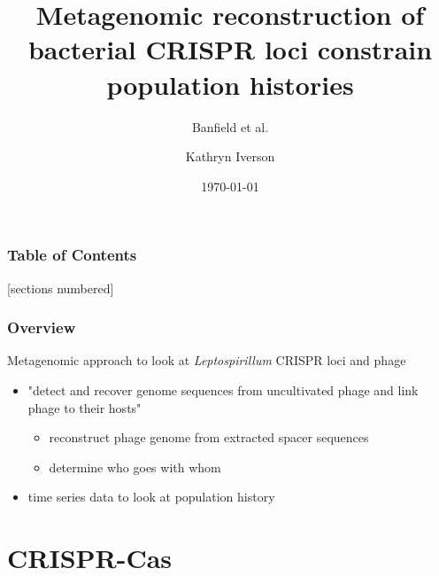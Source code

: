 \documentclass[10pt]{beamer}
\title{Metagenomic reconstruction of bacterial CRISPR loci constrain population histories}
\subtitle{Banfield et al.}
\date{\today}
\author{Kathryn Iverson}
\institute{Schloss Lab \\ \LaTeX}
\begin{document}
\maketitle

\begin{frame}
  \frametitle{Table of Contents}
  [sections numbered]
  \tableofcontents[hideallsubsections]
\end{frame}

\begin{frame}[fragile]
	\frametitle{Overview}

Metagenomic approach to look at \emph{Leptospirillum} CRISPR loci and phage
	\begin{itemize}
        \item "detect and recover genome sequences from uncultivated phage and link phage to their hosts"
        \begin{itemize}
        	\item reconstruct phage genome from extracted spacer sequences
            \item determine who goes with whom
        \end{itemize}
        \item time series data to look at population history
    \end{itemize}

\end{frame}
\section{CRISPR-Cas}
\end{document}
